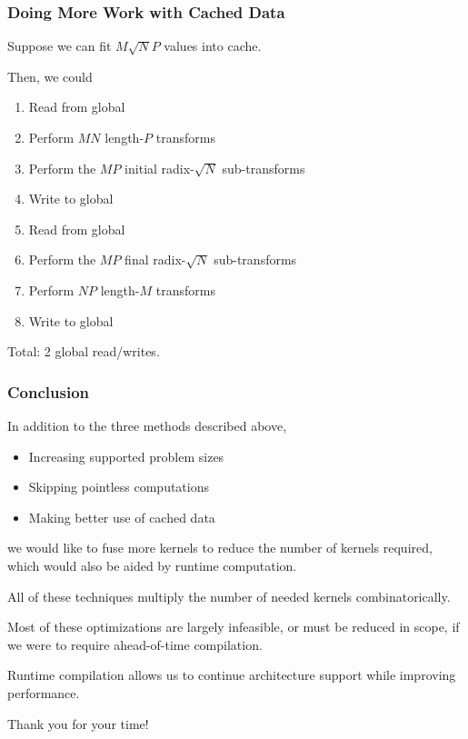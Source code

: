\documentclass[10pt,aspectratio=169]{beamer}
\begin{document}
\begin{frame}
  \frametitle{Doing More Work with Cached Data}

  Suppose we can fit $M\sqrt{N}P$ values into cache.

  Then, we could
  \begin{enumerate}
  \item Read from global
  \item Perform $MN$ length-$P$ transforms
  \item Perform the $MP$ initial radix-$\sqrt{N}$ sub-transforms
  \item Write to global
  \item Read from global
  \item Perform the $MP$ final radix-$\sqrt{N}$ sub-transforms
  \item Perform $NP$ length-$M$ transforms
  \item Write to global
  \end{enumerate}
  
  \begin{center}
    Total: 2 global read/writes.
  \end{center}

\end{frame}


\begin{frame}[fragile]
  \frametitle{Conclusion}

  In addition to the three methods described above,
  \begin{itemize}
  \item Increasing supported problem sizes
  \item Skipping pointless computations
  \item Making better use of cached data
  \end{itemize}
  we would like to fuse more kernels to reduce the number of kernels
  required, which would also be aided by runtime computation.

  \medskip

  All of these techniques multiply the number of needed kernels
  combinatorically.


  \medskip

  Most of these optimizations are largely infeasible, or must be reduced
  in scope, if we were to require ahead-of-time compilation.
  
  \medskip
  
  Runtime compilation allows us to continue architecture support while
  improving performance.

  \begin{center}
    Thank you for your time!
  \end{center}
  
\end{frame}
\end{document}
